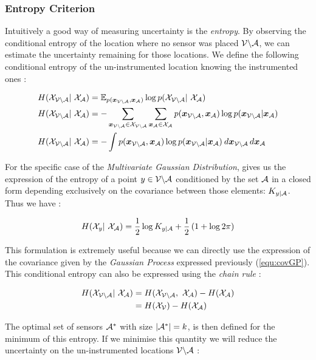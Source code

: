 \subsubsection{Entropy Criterion}

Intuitively a good way of measuring uncertainty is the \textit{entropy}. By observing the conditional entropy of the location where no sensor was placed $\mathcal{V} \backslash\mathcal{A}$, we can estimate the uncertainty remaining for those locations. We define the following conditional entropy of the un-instrumented location knowing the instrumented ones \citep[p.~16]{cover_elements_1991} :

\begin{align}
    H(\X_{\VA} | \X_\A) &= \mathbb{E}_{p(\vec{x}_{\VA},\vec{x}_\A)} \log p(\X_{\VA} | \X_\A) \\
    H(\X_{\VA} | \X_\A) &= - \sum_{\vec{x}_{\VA} \in \X_{\VA}}\sum_{\vec{x}_{\A} \in \X_{\A}} p(\vec{x}_{\VA},\vec{x}_\A) \log p(\vec{x}_{\VA}|\vec{x}_\A) \\
    H(\X_{\VA} | \X_\A) &= - \int p(\vec{x}_{\VA},\vec{x}_\A) \log p(\vec{x}_{\VA}|\vec{x}_\A) \: d\vec{x}_{\VA} \, d\vec{x}_\A 
\end{align}

For the specific case of the \textit{Multivariate Gaussian Distribution}, \citet{krause_near-optimal_2008} gives us the expression of the entropy of a point $y \in \mathcal{V} \backslash\mathcal{A}$ conditioned by the set $\mathcal{A}$ in a closed form depending exclusively on the covariance between those elements: $K_{y | \mathcal{A}}$. Thus we have :  

\begin{equation}
    H(\X_{y} | \X_\A) = \frac{1}{2} \log K_{y | \A} + \frac{1}{2} \left(1 + \log 2\pi  \right) \label{equ:entGP}
\end{equation}

This formulation is extremely useful because we can directly use the expression of the covariance given by the \textit{Gaussian Process} expressed previously (\ref{equ:covGP}). \\


This conditional entropy can also be expressed using the \textit{chain rule}  \citep[p.~16]{cover_elements_1991} : 

\begin{align}
    H(\X_{\VA} | \X_\A) &= H(\X_{\VA} ,  \X_\A) -  H(\X_{\A}) \\
    &= H(\X_{\V}) -  H(\X_{\A}) 
\label{equ:chainentropy}
\end{align}

The optimal set of sensors $\mathcal{A}^*$ with size $|\mathcal{A}^*| = k$, is then defined for the minimum of this entropy. If we minimise this quantity we will reduce the uncertainty on the un-instrumented locations $\mathcal{V} \backslash\mathcal{A}$ : 

